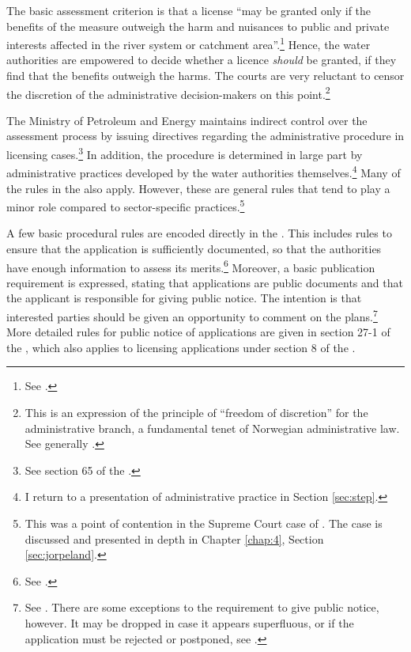 The basic assessment criterion is that a license ``may be granted only if the benefits of the measure outweigh the harm and nuisances to public and private interests affected in the river system or catchment area''.\footnote{See \cite[25]{wra00}.} Hence, the water authorities are empowered to decide whether a licence {\it should} be granted, if they find that the benefits outweigh the harms. The courts are very reluctant to censor the discretion of the administrative decision-makers on this point.\footnote{This is an expression of the principle of ``freedom of discretion'' for the administrative branch, a fundamental tenet of Norwegian administrative law. See generally \cite[71-74]{eckhoff14}.}

The Ministry of Petroleum and Energy maintains indirect control over the assessment process by issuing directives regarding the administrative procedure in licensing cases.\footnote{See section 65 of the \cite{wra00}.} In addition, the procedure is determined in large part by administrative practices developed by the water authorities themselves.\footnote{I return to a presentation of administrative practice in Section \ref{sec:step}.} Many of the rules in the \cite{paa67} also apply. However, these are general rules that tend to play a minor role compared to sector-specific practices.\footnote{This was a point of contention in the Supreme Court case of \cite{jorpeland11}. The case is discussed and presented in depth in Chapter \ref{chap:4}, Section \ref{sec:jorpeland}.}

A few basic procedural rules are encoded directly in the \cite{wra00}. This includes rules to ensure that the application is sufficiently documented, so that the authorities have enough information to assess its merits.\footnote{See \cite[23]{wra00}.} Moreover, a basic publication requirement is expressed, stating that applications are public documents and that the applicant is responsible for giving public notice. The intention is that interested parties should be given an opportunity to comment on the plans.\footnote{See \cite[24]{wra00}. There are some exceptions to the requirement to give public notice, however. It may be dropped in case it appears superfluous, or if the application must be rejected or postponed, see \cite[24a-24c]{wra00}.} More detailed rules for public notice of applications are given in section 27-1 of the \cite{pb08}, which also applies to licensing applications under section 8 of the \cite{wra00}.


